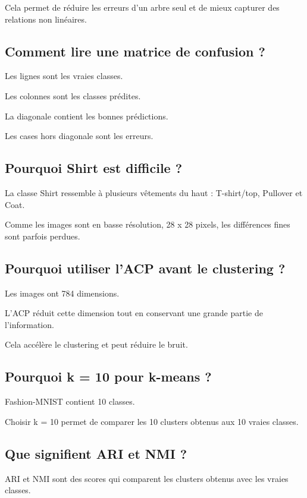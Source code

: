 \documentclass[11pt,a4paper]{article}
\begin{document}
Cela permet de réduire les erreurs d'un arbre seul et de mieux capturer des relations non linéaires.

\subsection{Comment lire une matrice de confusion ?}

Les lignes sont les vraies classes.

Les colonnes sont les classes prédites.

La diagonale contient les bonnes prédictions.

Les cases hors diagonale sont les erreurs.

\subsection{Pourquoi Shirt est difficile ?}

La classe Shirt ressemble à plusieurs vêtements du haut : T-shirt/top, Pullover et Coat.

Comme les images sont en basse résolution, 28 x 28 pixels, les différences fines sont parfois perdues.

\subsection{Pourquoi utiliser l'ACP avant le clustering ?}

Les images ont 784 dimensions.

L'ACP réduit cette dimension tout en conservant une grande partie de l'information.

Cela accélère le clustering et peut réduire le bruit.

\subsection{Pourquoi k = 10 pour k-means ?}

Fashion-MNIST contient 10 classes.

Choisir k = 10 permet de comparer les 10 clusters obtenus aux 10 vraies classes.

\subsection{Que signifient ARI et NMI ?}

ARI et NMI sont des scores qui comparent les clusters obtenus avec les vraies classes.
\end{document}
